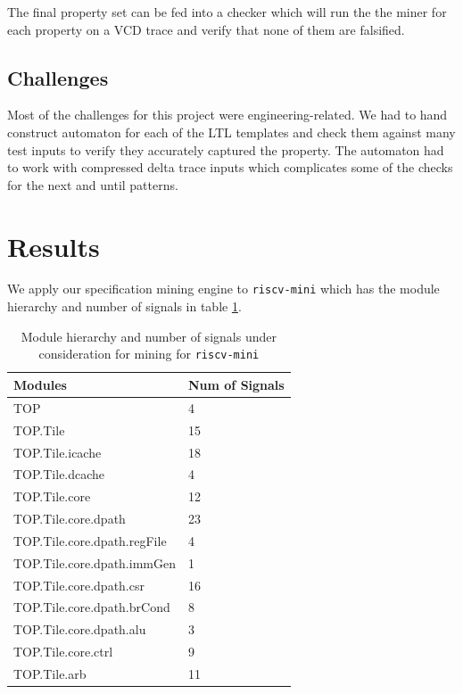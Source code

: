 \documentclass[acmlarge,11pt]{acmart}
\begin{document}
The final property set can be fed into a checker which will run the the miner for each property on a VCD trace and verify that none of them are falsified.

\subsection{Challenges}
Most of the challenges for this project were engineering-related.
We had to hand construct automaton for each of the LTL templates and check them against many test inputs to verify they accurately captured the property.
The automaton had to work with compressed delta trace inputs which complicates some of the checks for the next and until patterns.

\section{Results}
We apply our specification mining engine to \texttt{riscv-mini} which has the module hierarchy and number of signals in table \ref{tab:riscv-mini}.
\begin{table}
  \caption{Module hierarchy and number of signals under consideration for mining for \texttt{riscv-mini}}
  \label{tab:riscv-mini}
  \begin{tabular}{ll}
    \toprule
    Modules & Num of Signals \\
    \midrule
    TOP & 4 \\
    TOP.Tile & 15 \\
    TOP.Tile.icache & 18 \\
    TOP.Tile.dcache & 4 \\
    TOP.Tile.core & 12 \\
    TOP.Tile.core.dpath & 23 \\
    TOP.Tile.core.dpath.regFile & 4 \\
    TOP.Tile.core.dpath.immGen & 1 \\
    TOP.Tile.core.dpath.csr & 16 \\
    TOP.Tile.core.dpath.brCond & 8 \\
    TOP.Tile.core.dpath.alu & 3 \\
    TOP.Tile.core.ctrl & 9 \\
    TOP.Tile.arb & 11\\
  \bottomrule
  \end{tabular}
\end{table}
\end{document}
